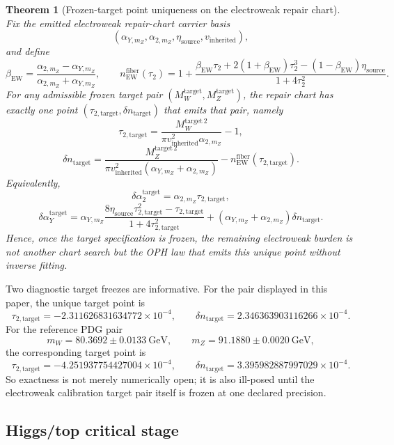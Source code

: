 \documentclass[11pt]{article}
\newtheorem{theorem}{Theorem}[section]
\begin{document}
\begin{theorem}[Frozen-target point uniqueness on the electroweak repair chart]
Fix the emitted electroweak repair-chart carrier basis
\[
(\alpha_{Y,m_Z},\alpha_{2,m_Z},\eta_{\mathrm{source}},v_{\mathrm{inherited}}),
\]
and define
\[
\beta_{\mathrm{EW}}
=
\frac{\alpha_{2,m_Z}-\alpha_{Y,m_Z}}
     {\alpha_{2,m_Z}+\alpha_{Y,m_Z}},
\qquad
n_{\mathrm{EW}}^{\mathrm{fiber}}(\tau_2)
=
1+
\frac{\beta_{\mathrm{EW}}\tau_2
+2(1+\beta_{\mathrm{EW}})\tau_2^3
-(1-\beta_{\mathrm{EW}})\eta_{\mathrm{source}}}
     {1+4\tau_2^2}.
\]
For any admissible frozen target pair
\((M_W^{\mathrm{target}},M_Z^{\mathrm{target}})\),
the repair chart has exactly one point
\((\tau_{2,\mathrm{target}},\delta n_{\mathrm{target}})\)
that emits that pair, namely
\[
\tau_{2,\mathrm{target}}
=
\frac{M_W^{\mathrm{target}\,2}}
     {\pi v_{\mathrm{inherited}}^2 \alpha_{2,m_Z}} - 1,
\]
\[
\delta n_{\mathrm{target}}
=
\frac{M_Z^{\mathrm{target}\,2}}
     {\pi v_{\mathrm{inherited}}^2(\alpha_{Y,m_Z}+\alpha_{2,m_Z})}
-
n_{\mathrm{EW}}^{\mathrm{fiber}}(\tau_{2,\mathrm{target}}).
\]
Equivalently,
\[
\delta\alpha_{2}^{\mathrm{target}}
=
\alpha_{2,m_Z}\tau_{2,\mathrm{target}},
\]
\[
\delta\alpha_{Y}^{\mathrm{target}}
=
\alpha_{Y,m_Z}
\frac{8\eta_{\mathrm{source}}\tau_{2,\mathrm{target}}^2-\tau_{2,\mathrm{target}}}
     {1+4\tau_{2,\mathrm{target}}^2}
+
(\alpha_{Y,m_Z}+\alpha_{2,m_Z})\delta n_{\mathrm{target}}.
\]
Hence, once the target specification is frozen, the remaining electroweak burden is not another chart
search but the OPH law that emits this unique point without inverse fitting.
\end{theorem}

Two diagnostic target freezes are informative. For the pair displayed in this paper, the unique target point is
\[
\tau_{2,\mathrm{target}}=-2.311626831634772\times10^{-4},
\qquad
\delta n_{\mathrm{target}}=2.346363903116266\times10^{-4}.
\]
For the reference PDG pair
\[
m_W = 80.3692\pm0.0133~\mathrm{GeV},
\qquad
m_Z = 91.1880\pm0.0020~\mathrm{GeV},
\]
the corresponding target point is
\[
\tau_{2,\mathrm{target}}=-4.251937754427004\times10^{-4},
\qquad
\delta n_{\mathrm{target}}=3.395982887997029\times10^{-4}.
\]
So exactness is not merely numerically open; it is also ill-posed until the electroweak calibration
target pair itself is frozen at one declared precision.

\subsection{Higgs/top critical stage}
\end{document}
